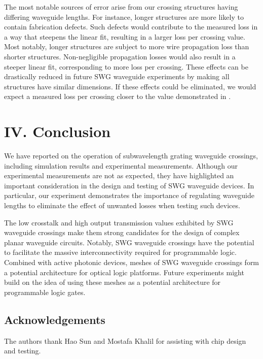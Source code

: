 \documentclass[aps,prl,twocolumn, superscriptaddress]{revtex4}
\begin{document}
The most notable sources of error arise from our crossing structures having differing waveguide lengths. For instance, longer structures are more likely to contain fabrication defects. Such defects would contribute to the measured loss in a way that steepens the linear fit, resulting in a larger loss per crossing value. Most notably, longer structures are subject to more wire propagation loss than shorter structures. Non-negligible propagation losses would also result in a steeper linear fit, corresponding to more loss per crossing. These effects can be drastically reduced in future SWG waveguide experiments by making all structures have similar dimensions. If these effects could be eliminated, we would expect a measured loss per crossing closer to the value demonstrated in \cite{BockPaper}.

\section{IV. Conclusion}
\vspace{-.1cm}
We have reported on the operation of subwavelength grating waveguide crossings, including simulation results and experimental measurements. Although our experimental measurements are not as expected, they have highlighted an important consideration in the design and testing of SWG waveguide devices. In particular, our experiment demonstrates the importance of regulating waveguide lengths to eliminate the effect of unwanted losses when testing such devices.

The low crosstalk and high output transmission values exhibited by SWG waveguide crossings make them strong candidates for the design of complex planar waveguide circuits. Notably, SWG waveguide crossings have the potential to facilitate the massive interconnectivity required for programmable logic. Combined with active photonic devices, meshes of SWG waveguide crossings form a potential architecture for optical logic platforms. Future experiments might build on the idea of using these meshes as a potential architecture for programmable logic gates.

\vspace{-1em}
\subsection{Acknowledgements}
\vspace{-1em}
\noindent The authors thank Hao Sun and Mostafa Khalil for assisting with chip design and testing. 


\end{document}
